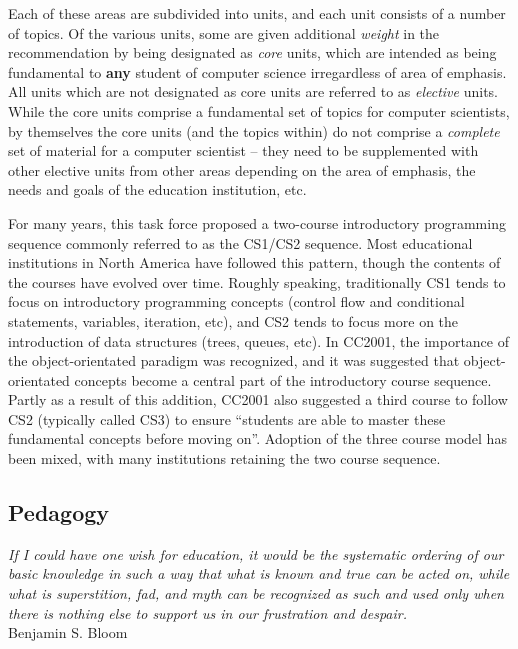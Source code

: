 Each of these areas are subdivided into units, and each unit consists of a number of topics.  Of the various units, some are given additional \emph{weight} in the recommendation by being designated as \emph{core} units, which are intended as being fundamental to \textbf{any} student of computer science irregardless of area of emphasis.  All units which are not designated as core units are referred to as \emph{elective} units.  While the core units comprise a fundamental set of topics for computer scientists, by themselves the core units (and the topics within) do not comprise a \emph{complete} set of material for a computer scientist -- they need to be supplemented with other elective units from other areas depending on the area of emphasis, the needs and goals of the education institution, etc.

For many years, this task force proposed a two-course introductory programming sequence commonly referred to as the CS1/CS2 sequence.  Most educational institutions in North America have followed this pattern, though the contents of the courses have evolved over time.  Roughly speaking, traditionally CS1 tends to focus on introductory programming concepts (control flow and conditional statements, variables, iteration, etc), and CS2 tends to focus more on the introduction of data structures (trees, queues, etc).  In CC2001, the importance of the object-orientated paradigm was recognized, and it was suggested that object-orientated concepts become a central part of the introductory course sequence.  Partly as a result of this addition, CC2001 also suggested a third course to follow CS2 (typically called CS3) to ensure ``students are able to master these fundamental concepts before moving on''\cite{cc2001}.  Adoption of the three course model has been mixed, with many institutions retaining the two course sequence.

\subsection{Pedagogy}

\begin{flushright}
\textit{If I could have one wish for education, it would be the systematic ordering of our basic knowledge in such a way that what is known and true can be acted on, while what is superstition, fad, and myth can be recognized as such and used only when there is nothing else to support us in our frustration and despair.}
\\
Benjamin S. Bloom \cite{Bloom72} \\
\end{flushright}

